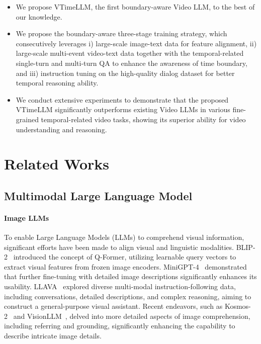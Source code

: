 \documentclass[10pt,twocolumn,letterpaper]{article}
\begin{document}
\begin{itemize}
\item We propose VTimeLLM, the first boundary-aware Video LLM, to the best of our knowledge.

\item We propose the boundary-aware three-stage training strategy, which consecutively leverages i) large-scale image-text data for feature alignment, ii) large-scale multi-event video-text data together with the temporal-related single-turn and multi-turn QA to enhance the awareness of time boundary, and iii) instruction tuning on the high-quality dialog dataset for better temporal reasoning ability.

\item We conduct extensive experiments to demonstrate that the proposed VTimeLLM significantly outperforms existing Video LLMs in various fine-grained temporal-related video tasks, showing its superior ability for video understanding and reasoning.
\end{itemize}

 \section{Related Works}

\subsection{Multimodal Large Language Model}

\paragraph{Image LLMs} To enable Large Language Models (LLMs) to comprehend visual information, significant efforts have been made to align visual and linguistic modalities. BLIP-2~\cite{li2023blip2} introduced the concept of Q-Former, utilizing learnable query vectors to extract visual features from frozen image encoders. MiniGPT-4~\cite{zhu2023minigpt} demonstrated that further fine-tuning with detailed image descriptions significantly enhances its usability. LLAVA~\cite{liu2023llava} explored diverse multi-modal instruction-following data, including conversations, detailed descriptions, and complex reasoning, aiming to construct a general-purpose visual assistant. Recent endeavors, such as Kosmos-2~\cite{peng2023kosmos2} and VisionLLM~\cite{wang2023visionllm}, delved into more detailed aspects of image comprehension, including referring and grounding, significantly enhancing the capability to describe intricate image details.
\end{document}
